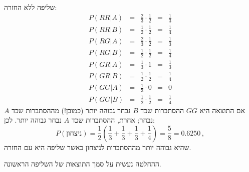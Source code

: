 שליפה ללא החזרה:
\[
\renewcommand*{\arraystretch}{1.5}
\begin{array}{lcccc}
P(RR|A) &=& \frac{2}{3} \cdot \frac{1}{2} &=& \frac{1}{3}\\
P(RR|B) &=& \frac{1}{2} \cdot \frac{1}{2} &=& \frac{1}{4}\\
\hline
P(RG|A) &=& \frac{2}{3} \cdot \frac{1}{2} &=& \frac{1}{3}\\
P(RG|B) &=& \frac{1}{2} \cdot \frac{1}{2} &=& \frac{1}{4}\\
\hline
P(GR|A) &=& \frac{1}{3} \cdot 1 &=& \frac{1}{3}\\
P(GR|B) &=& \frac{1}{2} \cdot \frac{1}{2} &=& \frac{1}{4}\\
\hline
P(GG|A) &=& \frac{1}{3} \cdot 0 &=& 0\\
P(GG|B) &=& \frac{1}{2} \cdot \frac{1}{2} &=& \frac{1}{4}
\end{array}
\]
אם התוצאה היא
$GG$
ההסתברות שכד
$B$
נבחר גבוהה יותר (כמובן!) מההסתברות שכד
$A$
נבחר; אחרת, ההסתברות שכד 
$A$
נבחר גבוהה יותר. לכן:
\[
P(\textrm{ניצחון})=\frac{1}{2}\left(\frac{1}{3} + \frac{1}{3}+ \frac{1}{3}+ \frac{1}{4}\right)=\frac{5}{8}=0.6250\,,
\]
שהיא גבוהה יותר מההסתברות לניצחון כאשר שליפה היא עם החזרה.

ההחלטה נעשית על סמך התוצאות של השליפה הראשונה.

